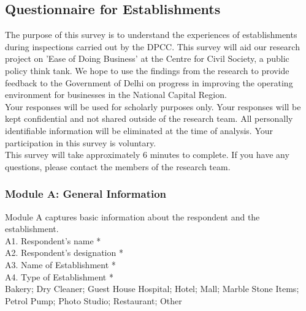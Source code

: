 \documentclass[a4paper, 12pt]{article}
\begin{document}
		\subsection*{Questionnaire for Establishments}	
	 \begin{mdframed}[backgroundcolor=gray!20]
	
	The purpose of this survey is to understand the experiences of establishments during inspections carried out by the DPCC. This survey will aid our research project on 'Ease of Doing Business' at the Centre for Civil Society, a public policy think tank. We hope to use the findings from the research to provide feedback to the Government of Delhi on progress in improving the operating environment for businesses in the National Capital Region. \\
		
		Your responses will be used for scholarly purposes only. Your responses will be kept confidential and not shared outside of the research team. All personally identifiable information will be eliminated at the time of analysis. Your participation in this survey is voluntary. \\
		
		This survey will take approximately 6 minutes to complete. If you have any questions, please contact the members of the research team. \\
		
		\begin{spacing}{0.5}
		\subsubsection*{Module A: General Information}
		
		Module A captures basic information about the respondent and the establishment. \\
		
		{A1. Respondent's name *} \\
		
		{A2. Respondent's designation *} \\
		
		{A3. Name of Establishment *} \\
		
		{A4. Type of Establishment *} \\
		
		Bakery; Dry Cleaner; Guest House Hospital; Hotel; Mall; Marble Stone Items; Petrol Pump; Photo Studio; Restaurant; Other \\
		

\end{spacing}
\end{mdframed}
\end{document}
